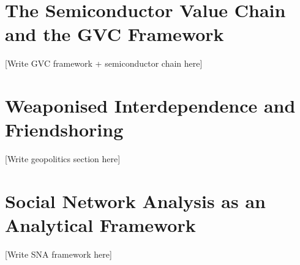
\section{The Semiconductor Value Chain and the GVC Framework}
\label{sec:gvc}


[Write GVC framework + semiconductor chain here]

\section{Weaponised Interdependence and Friendshoring}
\label{sec:geopolitics}


[Write geopolitics section here]

\section{Social Network Analysis as an Analytical Framework}
\label{sec:sna_theory}


[Write SNA framework here]
